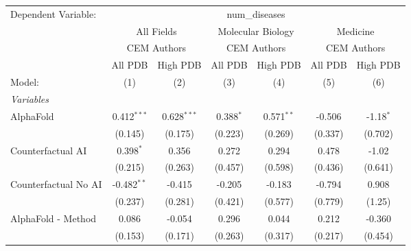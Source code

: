 \begingroup
\centering
\begin{tabular}{lcccccc}
   \tabularnewline \midrule \midrule
   Dependent Variable: & \multicolumn{6}{c}{num\_diseases}\\
 & \multicolumn{2}{c}{All Fields} & \multicolumn{2}{c}{Molecular Biology} & \multicolumn{2}{c}{Medicine} \\
\cmidrule(lr){2-3} \cmidrule(lr){4-5} \cmidrule(lr){6-7}
 & \multicolumn{2}{c}{CEM Authors} & \multicolumn{2}{c}{CEM Authors} & \multicolumn{2}{c}{CEM Authors} \\
\cmidrule(lr){2-3} \cmidrule(lr){4-5} \cmidrule(lr){6-7}
 & \multicolumn{1}{c}{All PDB} & \multicolumn{1}{c}{High PDB} & \multicolumn{1}{c}{All PDB} & \multicolumn{1}{c}{High PDB} & \multicolumn{1}{c}{All PDB} & \multicolumn{1}{c}{High PDB} \\
\cmidrule(lr){2-2} \cmidrule(lr){3-3} \cmidrule(lr){4-4} \cmidrule(lr){5-5} \cmidrule(lr){6-6} \cmidrule(lr){7-7}
   Model:                                                     & (1)           & (2)           & (3)          & (4)           & (5)     & (6)\\  
   \midrule
   \emph{Variables}\\
   AlphaFold                                                  & 0.412$^{***}$ & 0.628$^{***}$ & 0.388$^{*}$  & 0.571$^{**}$  & -0.506  & -1.18$^{*}$\\   
                                                              & (0.145)       & (0.175)       & (0.223)      & (0.269)       & (0.337) & (0.702)\\   
   Counterfactual AI                                          & 0.398$^{*}$   & 0.356         & 0.272        & 0.294         & 0.478   & -1.02\\   
                                                              & (0.215)       & (0.263)       & (0.457)      & (0.598)       & (0.436) & (0.641)\\   
   Counterfactual No AI                                       & -0.482$^{**}$ & -0.415        & -0.205       & -0.183        & -0.794  & 0.908\\   
                                                              & (0.237)       & (0.281)       & (0.421)      & (0.577)       & (0.779) & (1.25)\\   
   AlphaFold - Method                                         & 0.086         & -0.054        & 0.296        & 0.044         & 0.212   & -0.360\\   
                                                              & (0.153)       & (0.171)       & (0.263)      & (0.317)       & (0.217) & (0.454)\\   

\end{tabular}
